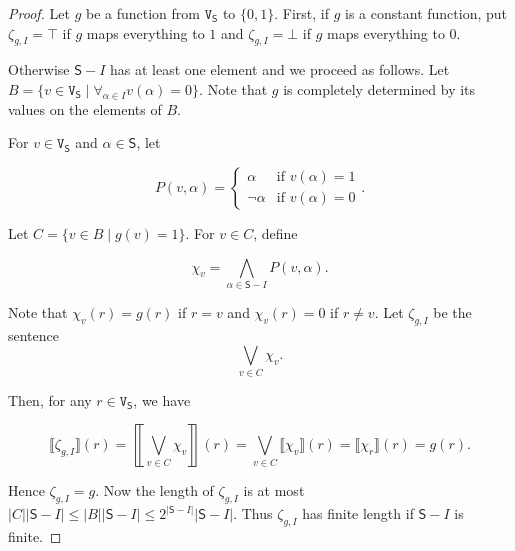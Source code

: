 \documentclass[12pt]{article}
\theoremstyle{remark}
\def\S{\textsf{S}}
\def\V{\texttt{V}}
\begin{document}
\begin{proof}
Let $g$ be a function from $\V_\S$ to  $\{0, 1\}$.  First, if $g$ is a constant function, put $\zeta_{g, I} = \top$ if $g$ maps everything to $1$ and $\zeta_{g, I} = \bot$ if $g$ maps everything to $0$.\newline

Otherwise $\S - I$ has at least one element and we proceed as follows.  Let $B = \{v \in \V_\S \mid \forall_{\alpha \in I} v(\alpha) = 0\}$. Note that $g$ is completely determined by its values on the elements of $B$. \newline

For $v \in \V_\S$ and $\alpha \in \S$, let 

\[P(v, \alpha) = \begin{cases}
\alpha & \text{if } v(\alpha) = 1 \\
\neg \alpha & \text{if } v(\alpha) = 0
\end{cases}.\]

Let $C = \{v \in B \mid g(v) = 1 \}$. For $v \in C$, define

\[\chi_v = \bigwedge_{\alpha \in \S - I} P(v, \alpha).\] 

Note that $\chi_v(r) = g(r)$ if $r = v$ and $\chi_v(r) = 0$ if $r \neq v$. Let $\zeta_{g, I}$ be the sentence
\[\bigvee_{v \in C} \chi_v.\]

Then, for any $r \in \V_\S$, we have 

\[\llbracket \zeta_{g, I} \rrbracket(r) = \left\llbracket\bigvee_{v \in C} \chi_v \right\rrbracket(r) = \bigvee_{v \in C} \llbracket \chi_v \rrbracket(r) = \llbracket \chi_r \rrbracket(r) = g(r).\]

Hence $\zeta_{g, I} = g$.  Now the length of  $\zeta_{g, I}$ is at most $|C||\S - I| \leq |B||\S - I| \leq 2^{|\S - I|}|\S - I|$. Thus $\zeta_{g, I}$ has finite length if  $\S - I$ is finite. 
\end{proof}
\end{document}
